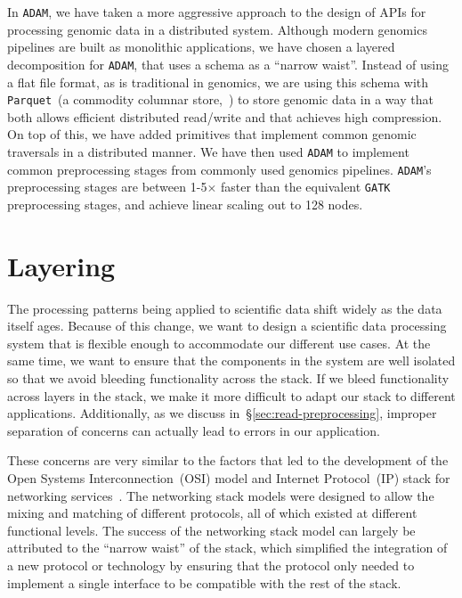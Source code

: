 \documentclass[masters]{ucbthesis}
\begin{document}
In \texttt{ADAM}, we have taken a more aggressive approach to the design of APIs for processing genomic data
in a distributed system. Although modern genomics pipelines are built as monolithic applications, we have
chosen a layered decomposition for \texttt{ADAM}, that uses a schema as a ``narrow waist''. Instead of using
a flat file format, as is traditional in genomics, we are using this schema with \texttt{Parquet}~(a commodity columnar
store,~\cite{parquet}) to store genomic data in a way that both allows efficient distributed read/write and that
achieves high compression. On top of this, we have added primitives that implement common genomic traversals
in a distributed manner. We have then used \texttt{ADAM} to implement common preprocessing stages from
commonly used genomics pipelines. \texttt{ADAM}'s preprocessing stages are between 1-5$\times$ faster than the
equivalent \texttt{GATK} preprocessing stages, and achieve linear scaling out to 128 nodes.

\section{Layering}
\label{sec:layering}

The processing patterns being applied to scientific data shift widely as the data itself ages. Because of
this change, we want to design a scientific data processing system that is flexible enough to
accommodate our different use cases. At the same time, we want to ensure that the components in the
system are well isolated so that we avoid bleeding functionality across the stack. If we bleed functionality
across layers in the stack, we make it more difficult to adapt our stack to different applications.
Additionally, as we discuss in~\S\ref{sec:read-preprocessing}, improper separation of concerns can
actually lead to errors in our application.

These concerns are very similar to the factors that led to the development of the Open Systems
Interconnection~(OSI) model and Internet Protocol~(IP) stack for networking
services~\cite{zimmermann80}. The networking stack models were designed to allow the mixing and
matching of different protocols, all of which existed at different functional levels. The success of the
networking stack model can largely be attributed to the ``narrow waist'' of the stack, which simplified the
integration of a new protocol or technology by ensuring that the protocol only needed to implement a
single interface to be compatible with the rest of the stack.
\end{document}
